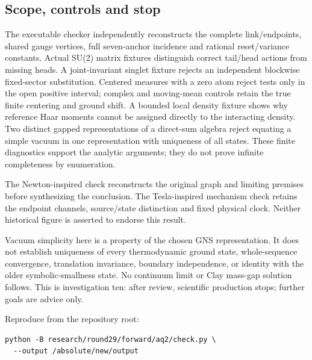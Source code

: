 \hypertarget{r29-aq2-scope-controls-and-stop}{%
\subsection{Scope, controls and stop}\label{r29:aq2:r29-aq2-scope-controls-and-stop}}

The executable checker independently reconstructs the complete link/endpoints, shared gauge vertices, full seven-anchor incidence and rational reset/variance constants. Actual SU(2) matrix fixtures distinguish correct tail/head actions from missing heads. A joint-invariant singlet fixture rejects an independent blockwise fixed-sector substitution. Centered measures with a zero atom reject tests only in the open positive interval; complex and moving-mean controls retain the true finite centering and ground shift. A bounded local density fixture shows why reference Haar moments cannot be assigned directly to the interacting density. Two distinct gapped representations of a direct-sum algebra reject equating a simple vacuum in one representation with uniqueness of all states. These finite diagnostics support the analytic arguments; they do not prove infinite completeness by enumeration.

The Newton-inspired check reconstructs the original graph and limiting premises before synthesizing the conclusion. The Tesla-inspired mechanism check retains the endpoint channels, source/state distinction and fixed physical clock. Neither historical figure is asserted to endorse this result.

Vacuum simplicity here is a property of the chosen GNS representation. It does not establish uniqueness of every thermodynamic ground state, whole-sequence convergence, translation invariance, boundary independence, or identity with the older symbolic-smallness state. No continuum limit or Clay mass-gap solution follows. This is investigation ten: after review, scientific production stops; further goals are advice only.

Reproduce from the repository root:
\begin{verbatim}
python -B research/round29/forward/aq2/check.py \
  --output /absolute/new/output
\end{verbatim}

